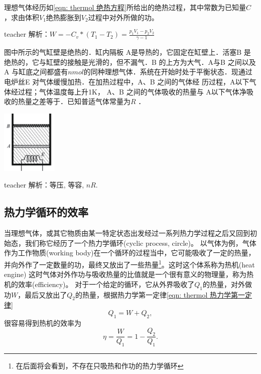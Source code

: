 \begin{example}
理想气体经历如\ref{eqn: thermol 绝热方程}所给出的绝热过程，其中常数为已知量$C$，求由体积$V_1$绝热膨胀到$V_2$过程中对外所做的功。
\begin{taggedblock}{teacher}
\newline
解析：$W=-C_v*(T_1-T_2)=\frac{p_1V_1-p_2V_2}{\gamma-1}$
\end{taggedblock}
\end{example}

\begin{example}
	图中所示的气缸壁是绝热的．缸内隔板 A是导热的，它固定在缸壁上．活塞B 是
	绝热的，它与缸壁的接触是光滑的，但不漏气．B 的上方为大气．A与B 之间以及 A 与缸底之间都盛有$n\si{mol}$的同种理想气体．系统在开始时处于平衡状态．现通过电炉丝E 对气体缓慢加热．在加热过程中，A、B 之间的气体经
	历\kong 过程，A以下气体经\kong 过程；气体温度每上升1K， A、B 之间的气体吸收的热量与 A以下气体净吸收的热量之差等于\kong ．已知普适气体常量为$R$ ．
	\begin{flushright}
		\includegraphics[width = 0.2\textwidth]{images/thermal-8.pdf} 
	\end{flushright}
	
	\begin{taggedblock}{teacher}
		\noindent
		解析：等压,  等容,  $nR$.
	\end{taggedblock}
\end{example}

\subsection{热力学循环的效率}
当理想气体，或其它物质由某一特定状态出发经过一系列热力学过程之后又回到初始态，我们称它经历了一个热力学{\heiti 循环}(cyclic process, circle)。
以气体为例，气体作为{\heiti 工作物质}(working body)在一个循环的过程当中，它可能吸收了一定的热量，并向外作了一定数量的功，最终又放出了一些热量\footnote{在后面将会看到，不存在只吸热和作功的热力学循环}。这时这个体系称为{\heiti 热机}(heat engine)
这时气体对外作功与吸收热量的比值就是一个很有意义的物理量，称为热机的{\heiti 效率}(efficiency)。
对于一个给定的循环，它从外界吸收了$Q_1$的热量，对外做功$W$，最后又放出了$Q_2$的热量，根据热力学第一定律\ref{eqn: thermol 热力学第一定律}
\begin{equation}
Q_1=W+Q_2,
\end{equation}
很容易得到热机的效率为
\begin{equation}
\eta = \frac{W}{Q_1} = 1-\frac{Q_2}{Q_1}.
\end{equation}

